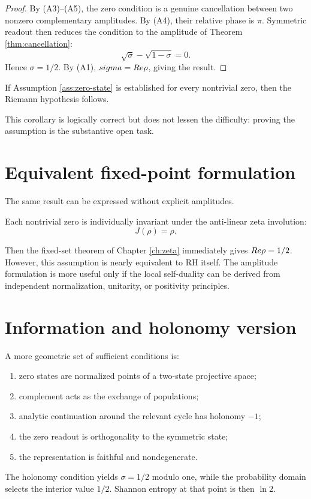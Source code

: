 \begin{proof}
By (A3)--(A5), the zero condition is a genuine cancellation between two nonzero complementary amplitudes. By (A4), their relative phase is $\pi$. Symmetric readout then reduces the condition to the amplitude of Theorem \ref{thm:cancellation}:
\begin{equation}
\sqrt{\sigma}-\sqrt{1-\sigma}=0.
\end{equation}
Hence $\sigma=1/2$. By (A1), $sigma=Re\rho$, giving the result.
\end{proof}

\begin{corollary}
If Assumption \ref{ass:zero-state} is established for every nontrivial zero, then the Riemann hypothesis follows.
\end{corollary}

This corollary is logically correct but does not lessen the difficulty: proving the assumption is the substantive open task.

\section{Equivalent fixed-point formulation}
The same result can be expressed without explicit amplitudes.

\begin{assumption}
Each nontrivial zero is individually invariant under the anti-linear zeta involution:
\begin{equation}
J(\rho)=\rho.
\end{equation}
\end{assumption}

Then the fixed-set theorem of Chapter \ref{ch:zeta} immediately gives $Re\rho=1/2$. However, this assumption is nearly equivalent to RH itself. The amplitude formulation is more useful only if the local self-duality can be derived from independent normalization, unitarity, or positivity principles.

\section{Information and holonomy version}
A more geometric set of sufficient conditions is:
\begin{enumerate}
\item zero states are normalized points of a two-state projective space;
\item complement acts as the exchange of populations;
\item analytic continuation around the relevant cycle has holonomy $-1$;
\item the zero readout is orthogonality to the symmetric state;
\item the representation is faithful and nondegenerate.
\end{enumerate}
The holonomy condition yields $\sigma=1/2$ modulo one, while the probability domain selects the interior value $1/2$. Shannon entropy at that point is then $\ln2$.

